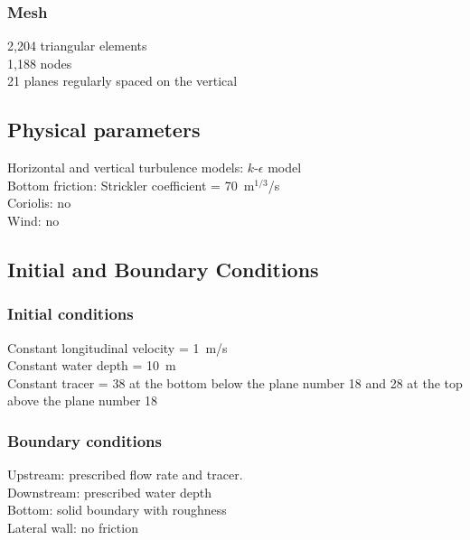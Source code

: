 \subsubsection{Mesh}
%
2,204 triangular elements\\
1,188 nodes\\
21 planes regularly spaced on the vertical
%
%
%
\subsection{Physical parameters}
%
Horizontal and vertical turbulence models: $k$-$\epsilon$ model\\
Bottom friction: Strickler coefficient = 70~m$^{1/3}$/s\\
Coriolis: no\\
Wind: no
%
%
%
%
%
%
\subsection{Initial and Boundary Conditions}
%
\subsubsection{Initial conditions}
%
Constant longitudinal velocity = 1~m/s\\
Constant water depth = 10~m\\
Constant tracer = 38 at the bottom below the plane number 18 and 28 at
the top above the plane number 18
%
\subsubsection{Boundary conditions}
%
Upstream: prescribed flow rate and tracer.\\
Downstream: prescribed water depth\\
Bottom: solid boundary with roughness\\
Lateral wall: no friction
%
